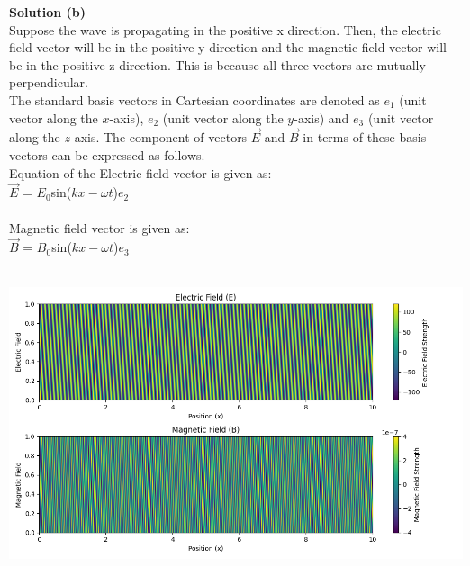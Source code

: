 \documentclass[journal,12pt,twocolumn]{IEEEtran}
\theoremstyle{remark}
\begin{document}
\newpage
\begin{flushleft}
    \textbf{Solution (b)}\\
    Suppose the wave is propagating in the positive x direction. Then, the electric field vector will be in the positive y direction and the magnetic field vector will be in the positive z direction. This is because all three vectors are mutually perpendicular.\\
    \bigskip
    The standard basis vectors in Cartesian coordinates are denoted as $e_1$ (unit vector along the $x$-axis), $e_2$ (unit vector along the $y$-axis) and $e_3$ (unit vector along the $z$ axis. The component of vectors $\vec{E}$ and $\vec{B}$ in terms of these basis vectors can be expressed as follows.\\\bigskip
    Equation of the Electric field vector is given as:\\
    $\vec{E}$ = $E_0$sin($kx - \omega t$)$e_2$\\
    \\
    \bigskip
    Magnetic field vector is given as:\\
    $\vec{B}$ = $B_0$sin($kx - \omega t$)$e_3$\\
    \\
    
     
\end{flushleft}

\renewcommand{\thefigure}{\theenumi}
\renewcommand{\thetable}{\theenumi}

\newpage
\begin{center}
    \begin{table}[h]
	
   \end{table}
    \bigskip
    \bigskip
    \includegraphics[width=1.0\textwidth]{Figure_1.png}
\end{center}
\end{document}

